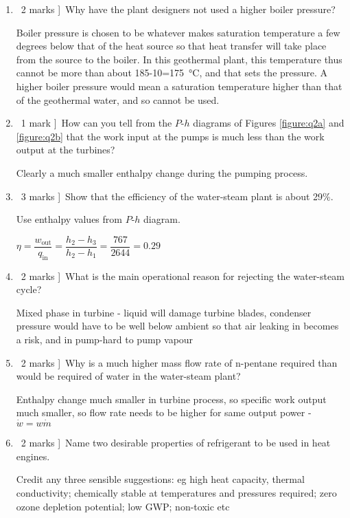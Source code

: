 \documentclass[a4paper,12pt,fleqn]{article}
\begin{document}
\begin{enumerate}[label=\alph*)]
\item \lbrack\ 2 marks ]\ Why have the plant designers not used a higher boiler pressure?\par
Boiler pressure is chosen to be whatever makes saturation temperature a few degrees below that of the heat source so that heat transfer will take place from the source to the boiler. In this geothermal plant, this temperature thus cannot be more than about 185-10=\SI{175}{\celsius}, and that sets the pressure. A higher boiler pressure would mean a saturation temperature higher than that of the geothermal water, and so cannot be used.
\item \lbrack\ 1 mark ]\ How can you tell from the $P$-$h$ diagrams of Figures \ref{figure:q2a} and \ref{figure:q2b} that the work input at the pumps is much less than the work output at the turbines?\par
Clearly a much smaller enthalpy change during the pumping  process.
\item \lbrack\ 3 marks ]\ Show that the efficiency of the water-steam plant is about 29\%.\par
Use enthalpy values from $P$-$h$ diagram.\par
$\eta=\dfrac{w_\mathrm{out}}{q_\mathrm{in}}=\dfrac{h_2-h_3}{h_2-h_1}=\dfrac{767}{2644}=0.29$
\item \lbrack\ 2 marks ]\ What is the main operational reason for rejecting the water-steam cycle?\par
Mixed phase in turbine - liquid will damage turbine blades, condenser pressure would have to be well below ambient so that air leaking in becomes a risk, and in pump-hard to pump vapour
\item \lbrack\ 2 marks ]\ Why is a much higher mass flow rate of n-pentane required than would be required of water in the water-steam plant?\par
Enthalpy change much smaller in turbine process, so specific work output much smaller, so flow rate needs to be higher for same output power - $\dot w=w\dot m$
\item \lbrack\ 2 marks ]\  Name two desirable properties of refrigerant to be used in heat engines.\par
Credit any three sensible suggestions: eg high heat capacity, thermal conductivity; chemically stable at temperatures and pressures required; zero ozone depletion potential; low GWP; non-toxic etc
\end{enumerate}
\end{document}

